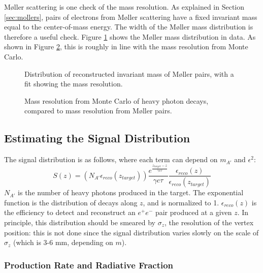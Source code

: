 M{\o}ller scattering is one check of the mass resolution.
As explained in Section \ref{sec:mollers}, pairs of electrons from M{\o}ller scattering have a fixed invariant mass equal to the center-of-mass energy.
The width of the M{\o}ller mass distribution is therefore a useful check.
Figure \ref{fig:moller_mres} shows the M{\o}ller mass distribution in data.
As shown in Figure \ref{fig:mres_datamc}, this is roughly in line with the mass resolution from Monte Carlo.

\begin{figure}[ht]
    \caption{Distribution of reconstructed invariant mass of M{\o}ller pairs, with a fit showing the mass resolution.}
    \label{fig:moller_mres}
\end{figure}

\begin{figure}[ht]
    \caption{Mass resolution from Monte Carlo of heavy photon decays, compared to mass resolution from M{\o}ller pairs.}
    \label{fig:mres_datamc}
\end{figure}

\subsection{Estimating the Signal Distribution}
\label{sec:signal_shape}
The signal distribution is as follows, where each term can depend on $m_{A'}$ and $\epsilon^2$:
\begin{equation}
S(z) = (N_{A'}\epsilon_{reco}(z_{target}))\frac{e^{\frac{z_{target}-z}{\gamma c \tau}}}{\gamma c \tau}\frac{\epsilon_{reco}(z)}{\epsilon_{reco}(z_{target})}
\end{equation}
$N_{A'}$ is the number of heavy photons produced in the target.
The exponential function is the distribution of decays along $z$, and is normalized to 1.
$\epsilon_{reco}(z)$ is the efficiency to detect and reconstruct an $e^+e^-$ pair produced at a given $z$.
In principle, this distribution should be smeared by $\sigma_z$, the resolution of the vertex position: this is not done since the signal distribution varies slowly on the scale of $\sigma_z$ (which is 3-6 mm, depending on $m$).

\subsubsection{Production Rate and Radiative Fraction}

